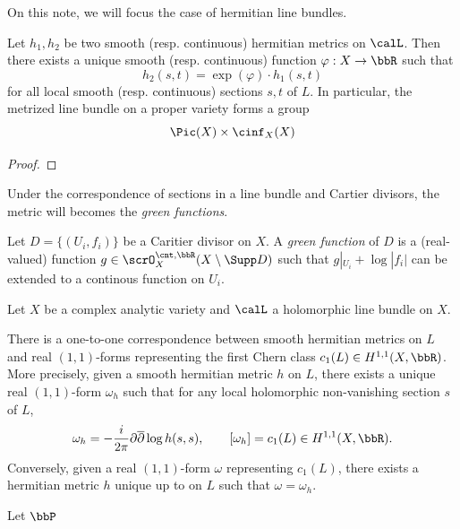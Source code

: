 On this note, we will focus the case of hermitian line bundles.

\begin{proposition}\label{prop:hermitian_metric_different_by_a_smooth_function_on_a_fixed_line_bundle}
	Let \(h_1,h_2\) be two smooth (resp. continuous) hermitian metrics on $\calL$.
	Then there exists a unique smooth (resp. continuous) function \(\varphi: X \to \bbR\) such that
	\[h_2(s,t) = \exp(\varphi) \cdot h_1(s,t)\]
	for all local smooth (resp. continuous) sections \(s,t\) of \(L\).
	In particular, the metrized line bundle on a proper variety forms a group 
	\[ \Pic(X) \times \cinf_X(X) \]
\end{proposition}
\begin{proof}
\end{proof}

Under the correspondence of sections in a line bundle and Cartier divisors, the metric will becomes the \emph{green functions}.

\begin{definition}\label{def:green-functions-for-a-divisor}
	Let $D = \{(U_i,f_i)\}$ be a Caritier divisor on $X$.
	A \emph{green function} of $D$ is a (real-valued) function $g \in \scrO_{X}^{\cnt,\bbR}(X \setminus \Supp D)$ such that $g|_{U_i} + \log |f_i|$ can be extended to a continous function on $U_i$.
\end{definition}




Let \(X\) be a complex analytic variety and $\calL$ a holomorphic line bundle on $X$.

\begin{proposition}\label{prop:correspondence_between_hermitian_metric_and_forms}
	There is a one-to-one correspondence between smooth hermitian metrics on \(L\) and real \((1,1)\)-forms representing the first Chern class \(c_1(L) \in H^{1,1}(X, \bbR)\).
	More precisely, given a smooth hermitian metric \(h\) on \(L\), there exists a unique real \((1,1)\)-form \(\omega_h\) such that for any local holomorphic non-vanishing section \(s\) of \(L\),
	\[\omega_h = -\frac{i}{2\pi} \partial \overline{\partial} \log h(s,s), \qquad [\omega_h] = c_1(L) \in H^{1,1}(X,\bbR).\]
	Conversely, given a real \((1,1)\)-form \(\omega\) representing \(c_1(L)\), there exists a hermitian metric \(h\) unique up to \Yang{} on \(L\) such that \(\omega = \omega_h\).
\end{proposition}


\begin{example}
	Let $\bbP$

\end{example}

